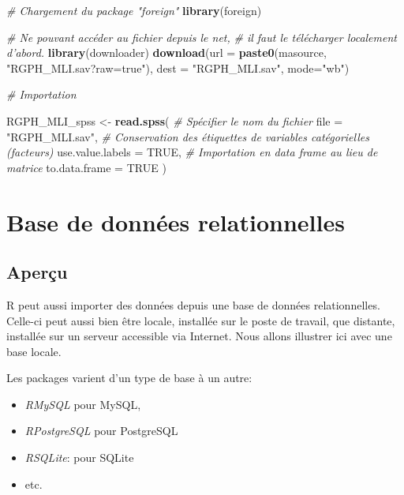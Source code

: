 \documentclass[]{book}
\newenvironment{Shaded}{\begin{snugshade}}{\end{snugshade}}
\newcommand{\KeywordTok}[1]{\textcolor[rgb]{0.13,0.29,0.53}{\textbf{#1}}}
\newcommand{\DataTypeTok}[1]{\textcolor[rgb]{0.13,0.29,0.53}{#1}}
\newcommand{\StringTok}[1]{\textcolor[rgb]{0.31,0.60,0.02}{#1}}
\newcommand{\CommentTok}[1]{\textcolor[rgb]{0.56,0.35,0.01}{\textit{#1}}}
\newcommand{\OtherTok}[1]{\textcolor[rgb]{0.56,0.35,0.01}{#1}}
\newcommand{\NormalTok}[1]{#1}
\begin{document}
\begin{Shaded}
\begin{Highlighting}[]
\CommentTok{# Chargement du package "foreign"}
\KeywordTok{library}\NormalTok{(foreign) }

\CommentTok{# Ne pouvant accéder au fichier depuis le net,}
\CommentTok{# il faut le télécharger localement d'abord.}
\KeywordTok{library}\NormalTok{(downloader)}
\KeywordTok{download}\NormalTok{(}\DataTypeTok{url =} \KeywordTok{paste0}\NormalTok{(masource, }\StringTok{"RGPH_MLI.sav?raw=true"}\NormalTok{), }
         \DataTypeTok{dest =} \StringTok{"RGPH_MLI.sav"}\NormalTok{, }
         \DataTypeTok{mode=}\StringTok{"wb"}\NormalTok{)}

\CommentTok{# Importation}

\NormalTok{RGPH_MLI_spss <-}\StringTok{ }\KeywordTok{read.spss}\NormalTok{(}
  \CommentTok{# Spécifier le nom du fichier}
  \DataTypeTok{file =} \StringTok{"RGPH_MLI.sav"}\NormalTok{, }
  \CommentTok{# Conservation des étiquettes de variables catégorielles (facteurs)}
  \DataTypeTok{use.value.labels =} \OtherTok{TRUE}\NormalTok{, }
  \CommentTok{# Importation en data frame au lieu de matrice}
  \DataTypeTok{to.data.frame =} \OtherTok{TRUE} 
\NormalTok{  )}
\end{Highlighting}
\end{Shaded}

\section{Base de données
relationnelles}\label{base-de-donnees-relationnelles}

\subsection{Aperçu}\label{apercu-4}

R peut aussi importer des données depuis une base de données
relationnelles. Celle-ci peut aussi bien être locale, installée sur le
poste de travail, que distante, installée sur un serveur accessible via
Internet. Nous allons illustrer ici avec une base locale.

Les packages varient d'un type de base à un autre:

\begin{itemize}
\item
  \emph{RMySQL} pour MySQL,
\item
  \emph{RPostgreSQL} pour PostgreSQL
\item
  \emph{RSQLite}: pour SQLite
\item
  etc.
\end{itemize}
\end{document}
